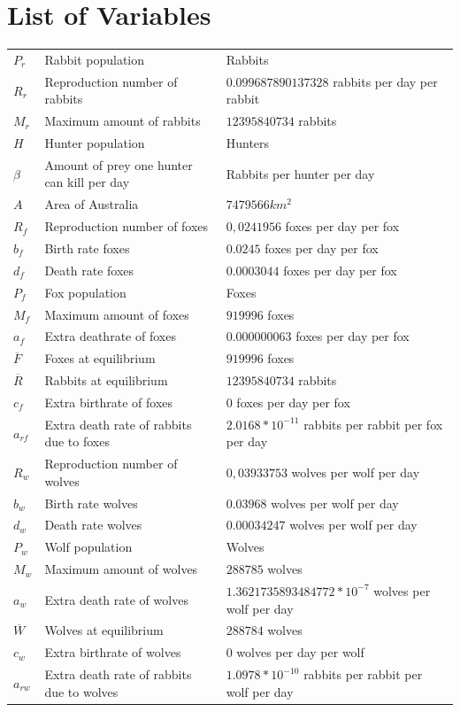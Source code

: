 \documentclass{article}
\begin{document}
\section*{List of Variables}
\begin{table}[h!]
\begin{tabular}{lll}
 $P_r$&Rabbit population&Rabbits\\
 $R_r$&Reproduction number of rabbits&$0.099687890137328$ rabbits per day per rabbit\\
 $M_r$&Maximum amount of rabbits&$12395840734$ rabbits\\
 $H$&Hunter population&Hunters\\
 $\beta$&Amount of prey one hunter can kill per day&Rabbits per hunter per day\\
 $A$&Area of Australia&$7 479 566 km^2$\\
 $R_f$&Reproduction number of foxes&$0,0241956$ foxes per day per fox\\
 $b_f$&Birth rate foxes&$0.0245$ foxes per day per fox\\
 $d_f$&Death rate foxes&$0.0003044$ foxes per day per fox\\
 $P_f$&Fox population&Foxes\\
 $M_f$&Maximum amount of foxes&$919996$ foxes\\
 $a_f$&Extra deathrate of foxes&$0.000000063$ foxes per day per fox\\
 $\overline{F}$&Foxes at equilibrium&$919996$ foxes\\
 $\overline{R}$&Rabbits at equilibrium&$12395840734$ rabbits\\
 $c_f$&Extra birthrate of foxes&$0$ foxes per day per fox\\
 $a_{rf}$&Extra death rate of rabbits due to foxes&$2.0168*10^{-11}$ rabbits per rabbit per fox per day\\
 $R_w$&Reproduction number of wolves&$0,03933753$ wolves per wolf per day\\
 $b_w$&Birth rate wolves&$0.03968$ wolves per wolf per day\\
 $d_w$&Death rate wolves&$0.00034247$ wolves per wolf per day\\
 $P_w$&Wolf population&Wolves\\
 $M_w$&Maximum amount of wolves&$288785$ wolves\\
 $a_w$&Extra death rate of wolves&$1.3621735893484772*10^{-7}$ wolves per wolf per day\\
 $\overline{W}$&Wolves at equilibrium&$288784$ wolves\\
 $c_w$&Extra birthrate of wolves&$0$ wolves per day per wolf\\
 $a_{rw}$&Extra death rate of rabbits due to wolves&$1.0978*10^{-10}$ rabbits per rabbit per wolf per day
\end{tabular}
\end{table}
\end{document}
